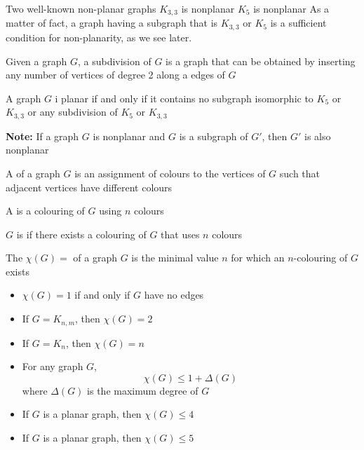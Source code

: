 \documentclass[aspectratio=43]{beamer}
\begin{document}
\begin{frame}{Two well-known non-planar graphs}
$K_{3,3}$ is nonplanar
\vfill
$K_5$ is nonplanar
\vfill
As a matter of fact, a graph having a subgraph that is $K_{3,3}$ or $K_5$ is a sufficient condition for non-planarity, as we see later.
\end{frame}


\begin{frame}
\begin{definition}[{Subdivision of $G$}]
Given a graph $G$, a subdivision of $G$ is a graph that can be obtained by inserting any number of vertices of degree 2 along a edges of $G$
\end{definition}
\vfill
\begin{theorem}
A graph $G$ i planar if and only if it contains no subgraph isomorphic to $K_5$ or $K_{3,3}$ or any subdivision of $K_5$ or $K_{3,3}$
\end{theorem}
\vfill
\textbf{Note:} If a graph $G$ is nonplanar and $G$ is a subgraph of $G'$, then $G'$ is also nonplanar
\end{frame}


\begin{frame}
\begin{definition}
A  of a graph $G$ is an assignment of colours to the vertices of $G$ such that adjacent vertices have different colours
\end{definition}
\vfill
\begin{definition}[{$n$-colouring of $G$}]
A  is a colouring of $G$ using $n$ colours
\end{definition}
\vfill
\begin{definition}[{$n$-colourable}]
$G$ is  if there exists a colouring of $G$ that uses $n$ colours
\end{definition}
\end{frame}


\begin{frame}
\begin{definition}
The  $\chi (G)=$ of a graph $G$ is the minimal value $n$ for which an $n$-colouring of $G$ exists
\end{definition}
\vfill
\begin{theorem}
\begin{itemize}
\item $\chi (G)=1$ if and only if $G$ have no edges
\item If $G=K_{n,m}$, then $\chi(G)=2$
\item If $G=K_n$, then $\chi(G)=n$
\item For any graph $G$, $$\chi (G)\leq 1+ \Delta (G)$$
where $\Delta (G)$ is the maximum degree of $G$
\item If $G$ is a planar graph, then $\chi(G) \leq 4$
\item If $G$ is a planar graph, then $\chi(G) \leq 5$
\end{itemize}
\end{theorem}
\end{frame}
\end{document}
